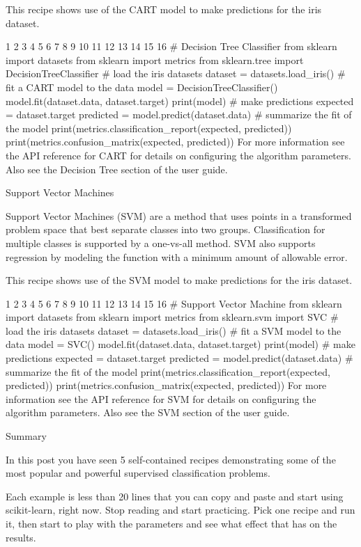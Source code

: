\documentclass[12pt]{article}
\begin{document}
This recipe shows use of the CART model to make predictions for the iris dataset.


1
2
3
4
5
6
7
8
9
10
11
12
13
14
15
16
# Decision Tree Classifier
from sklearn import datasets
from sklearn import metrics
from sklearn.tree import DecisionTreeClassifier
# load the iris datasets
dataset = datasets.load_iris()
# fit a CART model to the data
model = DecisionTreeClassifier()
model.fit(dataset.data, dataset.target)
print(model)
# make predictions
expected = dataset.target
predicted = model.predict(dataset.data)
# summarize the fit of the model
print(metrics.classification_report(expected, predicted))
print(metrics.confusion_matrix(expected, predicted))
For more information see the API reference for CART for details on configuring the algorithm parameters. Also see the Decision Tree section of the user guide.

Support Vector Machines

Support Vector Machines (SVM) are a method that uses points in a transformed problem space that best separate classes into two groups. Classification for multiple classes is supported by a one-vs-all method. SVM also supports regression by modeling the function with a minimum amount of allowable error.

This recipe shows use of the SVM model to make predictions for the iris dataset.


1
2
3
4
5
6
7
8
9
10
11
12
13
14
15
16
# Support Vector Machine
from sklearn import datasets
from sklearn import metrics
from sklearn.svm import SVC
# load the iris datasets
dataset = datasets.load_iris()
# fit a SVM model to the data
model = SVC()
model.fit(dataset.data, dataset.target)
print(model)
# make predictions
expected = dataset.target
predicted = model.predict(dataset.data)
# summarize the fit of the model
print(metrics.classification_report(expected, predicted))
print(metrics.confusion_matrix(expected, predicted))
For more information see the API reference for SVM for details on configuring the algorithm parameters. Also see the SVM section of the user guide.

Summary

In this post you have seen 5 self-contained recipes demonstrating some of the most popular and powerful supervised classification problems.

Each example is less than 20 lines that you can copy and paste and start using scikit-learn, right now. Stop reading and start practicing. Pick one recipe and run it, then start to play with the parameters and see what effect that has on the results.
\end{document}

